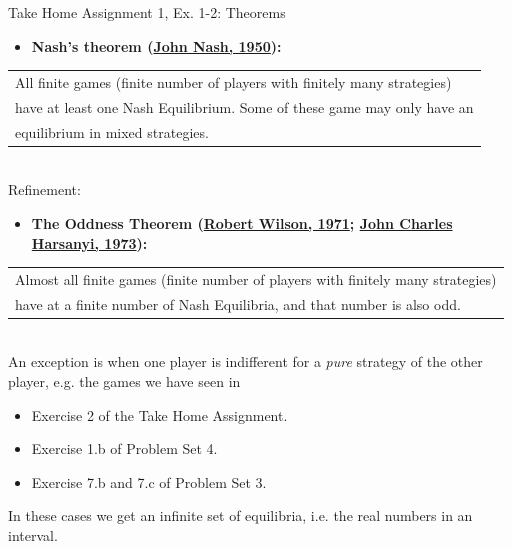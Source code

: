 \begin{frame}{Take Home Assignment 1, Ex. 1-2: Theorems}
  \begin{itemize}
    \item[(1)] \textbf{Nash's theorem (\href{https://rbsc.princeton.edu/sites/default/files/Non-Cooperative_Games_Nash.pdf}{John Nash, 1950}):}
  \end{itemize}
    \begin{tabular}{|l|}
      \cline{1-1}
        All finite games (finite number of players with finitely many strategies)\\
        have at least one Nash Equilibrium. Some of these game may only have an\\
        equilibrium in mixed strategies.\\\cline{1-1}
    \end{tabular}\\\bigskip
  Refinement:
  \begin{itemize}
    \item[(2)] \textbf{The Oddness Theorem (\href{http://www.dklevine.com/archive/refs4402.pdf}{Robert Wilson, 1971}; \href{https://link.springer.com/article/10.1007\%2FBF01737572\#page-1 }{John Charles Harsanyi, 1973}):}
  \end{itemize}
    \begin{tabular}{|l|}
      \cline{1-1}
        Almost all finite games (finite number of players with finitely many strategies)\\
        have at a finite number of Nash Equilibria, and that number is also odd.\\\cline{1-1}
    \end{tabular}\\\medskip
    An exception is when one player is indifferent for a \textit{pure} strategy of the other player, e.g. the games we have seen in
    \begin{itemize}
        \item Exercise 2 of the Take Home Assignment.
        \item Exercise 1.b of Problem Set 4.
        \item Exercise 7.b and 7.c of Problem Set 3.
    \end{itemize}
    In these cases we get an infinite set of equilibria, i.e. the real numbers in an interval.
  \vfill\null
\end{frame}

